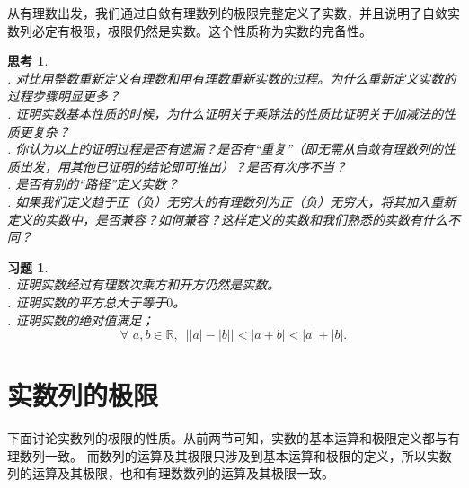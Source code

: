 \documentclass[12pt,UTF8]{ctexbook}
\newtheorem{sk}{思考}[section]
\newtheorem{xt}{习题}[section]
\begin{document}
\begin{appendix}
从有理数出发，我们通过自敛有理数列的极限完整定义了实数，并且说明了自敛实数列必定有极限，极限仍然是实数。这个性质称为实数的完备性。

\begin{sk}
    \mbox{} \\
    . 对比用整数重新定义有理数和用有理数重新实数的过程。为什么重新定义实数的过程步骤明显更多？\\
    . 证明实数基本性质的时候，为什么证明关于乘除法的性质比证明关于加减法的性质更复杂？\\
    . 你认为以上的证明过程是否有遗漏？是否有“重复”（即无需从自敛有理数列的性质出发，用其他已证明的结论即可推出）？是否有次序不当？\\
    . 是否有别的“路径”定义实数？\\
    . 如果我们定义趋于正（负）无穷大的有理数列为正（负）无穷大，将其加入重新定义的实数中，是否兼容？如何兼容？这样定义的实数和我们熟悉的实数有什么不同？
\end{sk}

\begin{xt}
    \mbox{} \\
    . 证明实数经过有理数次乘方和开方仍然是实数。\\
    . 证明实数的平方总大于等于$0$。\\
    . 证明实数的绝对值满足；
    $$\forall \,\, a, b\in\mathbb{R}, \,\,\, \big||a| - |b|\big| < |a + b| < |a| + |b|.$$
\end{xt}

\section{实数列的极限}
下面讨论实数列的极限的性质。从前两节可知，实数的基本运算和极限定义都与有理数列一致。
而数列的运算及其极限只涉及到基本运算和极限的定义，所以实数列的运算及其极限，也和有理数数列的运算及其极限一致。


\end{appendix}
\end{document}
